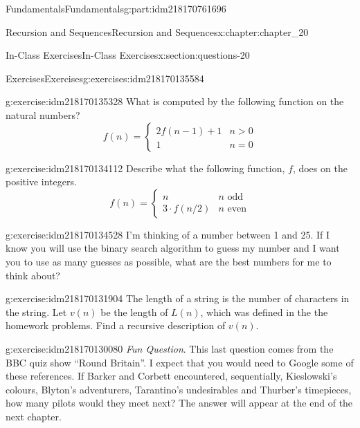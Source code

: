 \documentclass[oneside,10pt,]{book}
\numberwithin{equation}{section}
\newcommand{\gt}{>}
\begin{document}
\begin{partptx}{Fundamentals}{}{Fundamentals}{}{}{g:part:idm218170761696}
\begin{chapterptx}{Recursion and Sequences}{}{Recursion and Sequences}{}{}{x:chapter:chapter_20}
\begin{sectionptx}{In-Class Exercises}{}{In-Class Exercises}{}{}{x:section:questions-20}
\begin{exercises-subsection-numberless}{Exercises}{}{Exercises}{}{}{g:exercises:idm218170135584}
\begin{exercisegroup}
\begin{divisionexerciseeg}{1}{}{}{g:exercise:idm218170135328}
What is computed by the following function on the natural numbers?%
\begin{equation*}
f(n)=\begin{cases} 
2 f(n-1)+1 & n \gt 0 \\
1			 & n=0
\end{cases}
\end{equation*}
%
\end{divisionexerciseeg}%
\begin{divisionexerciseeg}{2}{}{}{g:exercise:idm218170134112}%
Describe what the following function, \(f\), does on the positive integers.%
\begin{equation*}
f(n)=\begin{cases} 
n & n\textrm{ odd} \\
3\cdot f(n/2) & n\textrm{ even}
\end{cases}
\end{equation*}
%
\end{divisionexerciseeg}%
\begin{divisionexerciseeg}{3}{}{}{g:exercise:idm218170134528}%
I'm thinking of a number between 1 and 25.  If I know you will use the binary search algorithm to guess my number and I want you to use as many guesses as possible, what are the best numbers for me to think about?%
\end{divisionexerciseeg}%
\begin{divisionexerciseeg}{4}{}{}{g:exercise:idm218170131904}%
The length of a string is the number of characters in the string. Let \(v(n)\) be the length of \(L(n)\), which was defined in the the homework problems.  Find a recursive description of \(v(n)\).%
\end{divisionexerciseeg}%
\begin{divisionexerciseeg}{5}{}{}{g:exercise:idm218170130080}%
\emph{Fun Question}.  This last question comes from the BBC quiz show ``Round Britain''. I expect that you would need to Google some of these references.  If Barker and Corbett encountered, sequentially, Kieslowski's colours, Blyton's adventurers, Tarantino's undesirables and Thurber's timepieces, how many pilots would they meet next?  The answer will appear at the end of the next chapter.%
\end{divisionexerciseeg}%
\end{exercisegroup}
\par\medskip\noindent
\end{exercises-subsection-numberless}
\end{sectionptx}
%
%
\typeout{************************************************}

\end{chapterptx}
\end{partptx}
\end{document}
